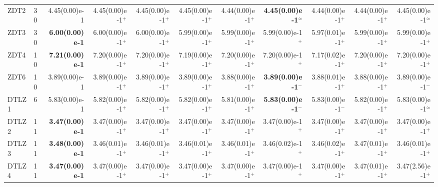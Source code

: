 \documentclass[pdflatex,sn-mathphys-ay]{sn-jnl}%
\theoremstyle{thmstyleone}%
\theoremstyle{thmstyletwo}%
\theoremstyle{thmstylethree}%
\begin{document}
\begin{landscape}
{\begin{longtable}{llrrrrrrrrr}
			ZDT2                              & 30  & 4.45(0.00)e-1          & 4.45(0.00)e-1$^{+}$                & 4.45(0.00)e-1$^{+}$          & 4.45(0.00)e-1$^{+}$       & 4.44(0.00)e-1$^{+}$          & \textbf{4.45(0.00)e-1}$^{\approx}$ & 4.44(0.00)e-1$^{+}$          & 4.44(0.00)e-1$^{+}$          & 4.45(0.00)e-1$^{\approx}$ \\
			ZDT3                              & 30  & \textbf{6.00(0.00)e-1} & 6.00(0.00)e-1$^{+}$                & 6.00(0.00)e-1$^{+}$          & 5.99(0.00)e-1$^{+}$       & 5.99(0.00)e-1$^{+}$          & 5.99(0.00)e-1$^{+}$                & 5.97(0.01)e-1$^{+}$          & 5.99(0.00)e-1$^{+}$          & 5.99(0.00)e-1$^{+}$       \\
			ZDT4                              & 10  & \textbf{7.21(0.00)e-1} & 7.20(0.00)e-1$^{+}$                & 7.20(0.00)e-1$^{+}$          & 7.19(0.00)e-1$^{+}$       & 7.20(0.00)e-1$^{+}$          & 7.20(0.00)e-1$^{+}$                & 7.17(0.02)e-1$^{+}$          & 7.20(0.00)e-1$^{+}$          & 7.20(0.00)e-1$^{+}$       \\
			ZDT6                              & 10  & 3.89(0.00)e-1          & 3.89(0.00)e-1$^{+}$                & 3.89(0.00)e-1$^{+}$          & 3.89(0.00)e-1$^{+}$       & 3.88(0.00)e-1$^{+}$          & \textbf{3.89(0.00)e-1}$^{-}$       & 3.88(0.01)e-1$^{+}$          & 3.88(0.00)e-1$^{+}$          & 3.89(0.00)e-1$^{-}$       \\
			\midrule
			DTLZ1                             & 6   & 5.83(0.00)e-1          & 5.82(0.00)e-1$^{+}$                & 5.82(0.00)e-1$^{+}$          & 5.82(0.00)e-1$^{+}$       & 5.81(0.00)e-1$^{+}$          & \textbf{5.83(0.00)e-1}$^{-}$       & 5.83(0.00)e-1$^{-}$          & 5.82(0.00)e-1$^{+}$          & 5.83(0.00)e-1$^{\approx}$ \\
			DTLZ2                             & 11  & \textbf{3.47(0.00)e-1} & 3.47(0.00)e-1$^{+}$                & 3.47(0.00)e-1$^{+}$          & 3.47(0.00)e-1$^{+}$       & 3.47(0.00)e-1$^{+}$          & 3.47(0.00)e-1$^{+}$                & 3.47(0.00)e-1$^{+}$          & 3.47(0.00)e-1$^{+}$          & 3.47(0.00)e-1$^{+}$       \\
			DTLZ3                             & 11  & \textbf{3.48(0.00)e-1} & 3.46(0.01)e-1$^{+}$                & 3.46(0.01)e-1$^{+}$          & 3.46(0.01)e-1$^{+}$       & 3.46(0.01)e-1$^{+}$          & 3.46(0.02)e-1$^{+}$                & 3.46(0.02)e-1$^{+}$          & 3.47(0.01)e-1$^{+}$          & 3.46(0.01)e-1$^{+}$       \\
			DTLZ4                             & 11  & \textbf{3.47(0.00)e-1} & 3.47(0.00)e-1$^{+}$                & 3.47(0.00)e-1$^{+}$          & 3.47(0.00)e-1$^{+}$       & 3.47(0.00)e-1$^{+}$          & 3.47(0.00)e-1$^{+}$                & 3.47(0.00)e-1$^{+}$          & 3.47(0.01)e-1$^{+}$          & 3.47(2.56)e-1$^{+}$       \\

\end{longtable}}
\end{landscape}
\end{document}
